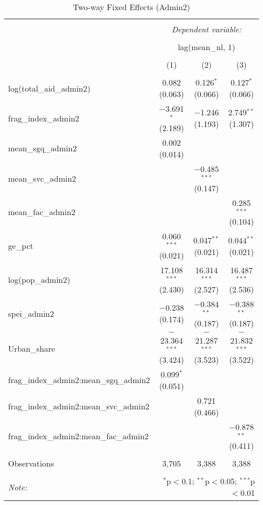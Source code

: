 
\begin{table}[!htbp] \centering 
  \caption{Two-way Fixed Effects (Admin2)} 
  \label{} 
\begin{tabular}{@{\extracolsep{5pt}}lccc} 
\\[-1.8ex]\hline 
\hline \\[-1.8ex] 
 & \multicolumn{3}{c}{\textit{Dependent variable:}} \\ 
\cline{2-4} 
\\[-1.8ex] & \multicolumn{3}{c}{lag(mean\_nl, 1)} \\ 
\\[-1.8ex] & (1) & (2) & (3)\\ 
\hline \\[-1.8ex] 
 log(total\_aid\_admin2) & 0.082 (0.063) & 0.126$^{*}$ (0.066) & 0.127$^{*}$ (0.066) \\ 
  frag\_index\_admin2 & $-$3.691$^{*}$ (2.189) & $-$1.246 (1.193) & 2.749$^{**}$ (1.307) \\ 
  mean\_sgq\_admin2 & 0.002 (0.014) &  &  \\ 
  mean\_svc\_admin2 &  & $-$0.485$^{***}$ (0.147) &  \\ 
  mean\_fac\_admin2 &  &  & 0.285$^{***}$ (0.104) \\ 
  ge\_pct & 0.060$^{***}$ (0.021) & 0.047$^{**}$ (0.021) & 0.044$^{**}$ (0.021) \\ 
  log(pop\_admin2) & 17.108$^{***}$ (2.430) & 16.314$^{***}$ (2.527) & 16.487$^{***}$ (2.536) \\ 
  spei\_admin2 & $-$0.238 (0.174) & $-$0.384$^{**}$ (0.187) & $-$0.388$^{**}$ (0.187) \\ 
  Urban\_share & $-$23.364$^{***}$ (3.424) & $-$21.287$^{***}$ (3.523) & $-$21.832$^{***}$ (3.522) \\ 
  frag\_index\_admin2:mean\_sgq\_admin2 & 0.099$^{*}$ (0.051) &  &  \\ 
  frag\_index\_admin2:mean\_svc\_admin2 &  & 0.721 (0.466) &  \\ 
  frag\_index\_admin2:mean\_fac\_admin2 &  &  & $-$0.878$^{**}$ (0.411) \\ 
 \hline \\[-1.8ex] 
Observations & 3,705 & 3,388 & 3,388 \\ 
\hline 
\hline \\[-1.8ex] 
\textit{Note:}  & \multicolumn{3}{r}{$^{*}$p$<$0.1; $^{**}$p$<$0.05; $^{***}$p$<$0.01} \\ 
\end{tabular} 
\end{table} 

